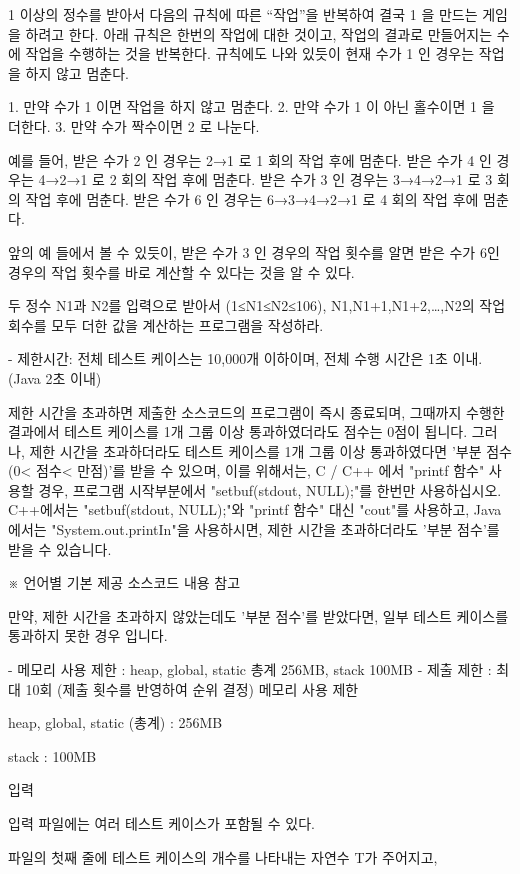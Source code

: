 \documentclass [12pt] {oblivoir}
\begin{document}
1 이상의 정수를 받아서 다음의 규칙에 따른 “작업”을 반복하여 결국 1 을 만드는 게임을 하려고 한다.
아래 규칙은 한번의 작업에 대한 것이고, 작업의 결과로 만들어지는 수에 작업을 수행하는 것을 반복한다. 규칙에도 나와 있듯이 현재 수가 1 인 경우는 작업을 하지 않고 멈춘다.

  1. 만약 수가 1 이면 작업을 하지 않고 멈춘다.
  2. 만약 수가 1 이 아닌 홀수이면 1 을 더한다.
  3. 만약 수가 짝수이면 2 로 나눈다.

예를 들어, 받은 수가 2 인 경우는 2→1 로 1 회의 작업 후에 멈춘다.
받은 수가 4 인 경우는 4→2→1 로 2 회의 작업 후에 멈춘다.
받은 수가 3 인 경우는 3→4→2→1 로 3 회의 작업 후에 멈춘다.
받은 수가 6 인 경우는 6→3→4→2→1 로 4 회의 작업 후에 멈춘다.

앞의 예 들에서 볼 수 있듯이, 받은 수가 3 인 경우의 작업 횟수를 알면 받은 수가 6인 경우의 작업 횟수를 바로 계산할 수 있다는 것을 알 수 있다.

두 정수 N1과 N2를 입력으로 받아서 (1≤N1≤N2≤106), N1,N1+1,N1+2,…,N2의 작업 회수를 모두 더한 값을 계산하는 프로그램을 작성하라.

- 제한시간: 전체 테스트 케이스는 10,000개 이하이며, 전체 수행 시간은 1초 이내. (Java 2초 이내)

제한 시간을 초과하면 제출한 소스코드의 프로그램이 즉시 종료되며,
그때까지 수행한 결과에서 테스트 케이스를 1개 그룹 이상 통과하였더라도 점수는 0점이 됩니다.
그러나, 제한 시간을 초과하더라도 테스트 케이스를 1개 그룹 이상 통과하였다면 '부분 점수(0< 점수< 만점)'를 받을 수 있으며,
이를 위해서는, C / C++ 에서 "printf 함수" 사용할 경우, 프로그램 시작부분에서 "setbuf(stdout, NULL);"를 한번만 사용하십시오.
C++에서는 "setbuf(stdout, NULL);"와 "printf 함수" 대신 "cout"를 사용하고, Java에서는 "System.out.printIn"을 사용하시면,
제한 시간을 초과하더라도 '부분 점수'를 받을 수 있습니다.

※ 언어별 기본 제공 소스코드 내용 참고

만약, 제한 시간을 초과하지 않았는데도 '부분 점수'를 받았다면, 일부 테스트 케이스를 통과하지 못한 경우 입니다.

- 메모리 사용 제한 : heap, global, static 총계 256MB, stack 100MB
- 제출 제한 : 최대 10회 (제출 횟수를 반영하여 순위 결정)
메모리 사용 제한

heap, global, static (총계) : 256MB

stack : 100MB

입력

입력 파일에는 여러 테스트 케이스가 포함될 수 있다.

파일의 첫째 줄에 테스트 케이스의 개수를 나타내는 자연수 T가 주어지고,
\end{document}

